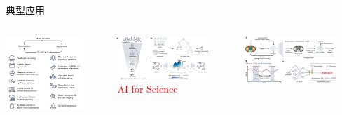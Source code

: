 \begin{frame}{典型应用}
  \begin{columns}
    \centering
    \includegraphics[width=0.8\textwidth]{Figures/AI_for_Science-1.png}

    \centering
    \includegraphics[width=0.8\textwidth]{Figures/AI_for_Science-3.jpeg}\\
    \textcolor{red}{\textrm{AI for Science}}

    \centering
    \includegraphics[width=0.8\textwidth]{Figures/AI_for_Science-4.jpeg}
  \end{columns}
\end{frame}

